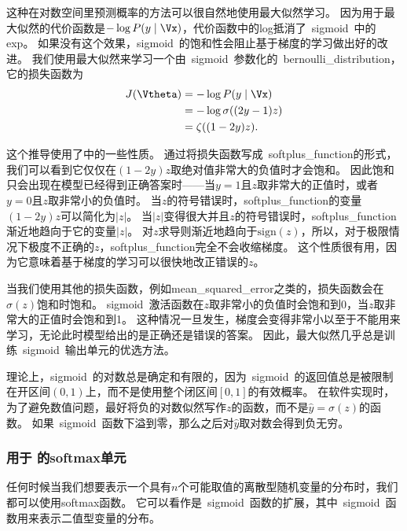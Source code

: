 
这种在对数空间里预测概率的方法可以很自然地使用最大似然学习。
因为用于最大似然的代价函数是$-\log P(y\mid\Vx)$，代价函数中的log抵消了~\gls{sigmoid}~中的exp。
如果没有这个效果，\gls{sigmoid}~的饱和性会阻止基于梯度的学习做出好的改进。
我们使用最大似然来学习一个由~\gls{sigmoid}~参数化的~\gls{bernoulli_distribution}，它的损失函数为
\begin{align}
J(\Vtheta) &= -\log P(y\mid\Vx)\\
&= -\log \sigma ((2y-1)z)\\
&= \zeta((1-2y)z).
\end{align}

这个推导使用了中的一些性质。
通过将损失函数写成~\gls{softplus_function}的形式，我们可以看到它仅仅在$(1-2y)z$取绝对值非常大的负值时才会饱和。
因此饱和只会出现在模型已经得到正确答案时——当$y=1$且$z$取非常大的正值时，或者$y=0$且$z$取非常小的负值时。
当$z$的符号错误时，\gls{softplus_function}的变量$(1-2y)z$可以简化为$|z|$。
当$|z|$变得很大并且$z$的符号错误时，\gls{softplus_function}渐近地趋向于它的变量$|z|$。
对$z$求导则渐近地趋向于$\text{sign}(z)$，所以，对于极限情况下极度不正确的$z$，\gls{softplus_function}完全不会收缩梯度。
这个性质很有用，因为它意味着基于梯度的学习可以很快地改正错误的$z$。

当我们使用其他的损失函数，例如\gls{mean_squared_error}之类的，损失函数会在$\sigma(z)$饱和时饱和。
\gls{sigmoid}~激活函数在$z$取非常小的负值时会饱和到0，当$z$取非常大的正值时会饱和到1。
这种情况一旦发生，梯度会变得非常小以至于不能用来学习，无论此时模型给出的是正确还是错误的答案。
因此，最大似然几乎总是训练~\gls{sigmoid}~输出单元的优选方法。

理论上，\gls{sigmoid}~的对数总是确定和有限的，因为~\gls{sigmoid}~的返回值总是被限制在开区间$(0, 1)$上，而不是使用整个闭区间$[0, 1]$的有效概率。
在软件实现时，为了避免数值问题，最好将负的对数似然写作$z$的函数，而不是$\hat{y}=\sigma(z)$的函数。
如果~\gls{sigmoid}~函数下溢到零，那么之后对$\hat{y}$取对数会得到负无穷。

\subsubsection{用于
的softmax单元}
\label{sec:softmax_units_for_multinoulli_output_distributions}

任何时候当我们想要表示一个具有$n$个可能取值的离散型随机变量的分布时，我们都可以使用softmax函数。
它可以看作是~\gls{sigmoid}~函数的扩展，其中~\gls{sigmoid}~函数用来表示二值型变量的分布。

